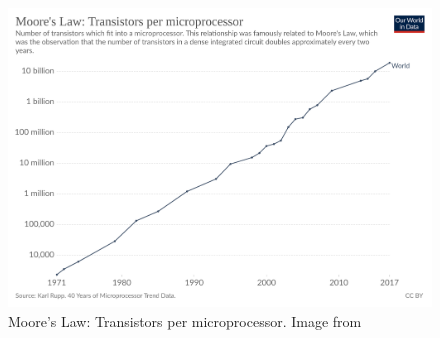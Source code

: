 \begin{figure} [!h]
\centering
\includegraphics[scale=.1]{methodology/images/transistors-per-microprocessor.png}
\caption[Moore's Law]{Moore's Law: Transistors per microprocessor.  Image from \cite{world_data}}
\label{img_moores}
\end{figure}